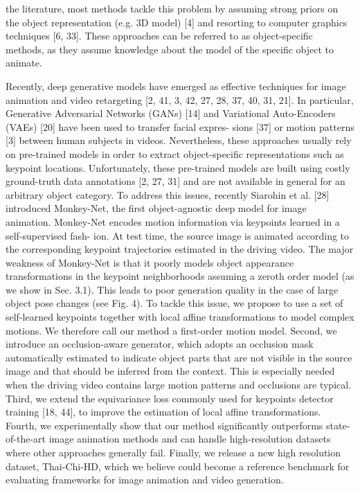 \documentclass[english,12pt]{article}
\begin{document}
the literature, most methods tackle this problem by assuming strong priors on the object representation
(e.g. 3D model) [4] and resorting to computer graphics techniques [6, 33]. These approaches can be referred
to as object-specific methods, as they assume knowledge about the model of the specific object to animate.

Recently, deep generative models have emerged as effective techniques for image animation and video
retargeting [2, 41, 3, 42, 27, 28, 37, 40, 31, 21]. In particular, Generative Adversarial Networks (GANs)
[14] and Variational Auto-Encoders (VAEs) [20] have been used to transfer facial expres- sions [37] or
motion patterns [3] between human subjects in videos. Nevertheless, these approaches usually rely on
pre-trained models in order to extract object-specific representations such as keypoint locations.
Unfortunately, these pre-trained models are built using costly ground-truth data annotations [2, 27, 31]
and are not available in general for an arbitrary object category. To address this issues, recently
Siarohin et al. [28] introduced Monkey-Net, the first object-agnostic deep model for image animation.
Monkey-Net encodes motion information via keypoints learned in a self-supervised fash- ion. At test time,
the source image is animated according to the corresponding keypoint trajectories estimated in the driving
video. The major weakness of Monkey-Net is that it poorly models object appearance transformations in the
keypoint neighborhoods assuming a zeroth order model (as we show in Sec. 3.1). This leads to poor generation
quality in the case of large object pose changes (see Fig. 4). To tackle this issue, we propose to use a
set of self-learned keypoints together with local affine transformations to model complex motions. We
therefore call our method a first-order motion model. Second, we introduce an occlusion-aware generator,
which adopts an occlusion mask automatically estimated to indicate object parts that are not visible in the
source image and that should be inferred from the context. This is especially needed when the driving video
contains large motion patterns and occlusions are typical. Third, we extend the equivariance loss commonly
used for keypoints detector training [18, 44], to improve the estimation of local affine transformations.
Fourth, we experimentally show that our method significantly outperforms state-of-the-art image animation
methods and can handle high-resolution datasets where other approaches generally fail. Finally, we release
a new high resolution dataset, Thai-Chi-HD, which we believe could become a reference benchmark for evaluating
frameworks for image animation and video generation.
\end{document}
